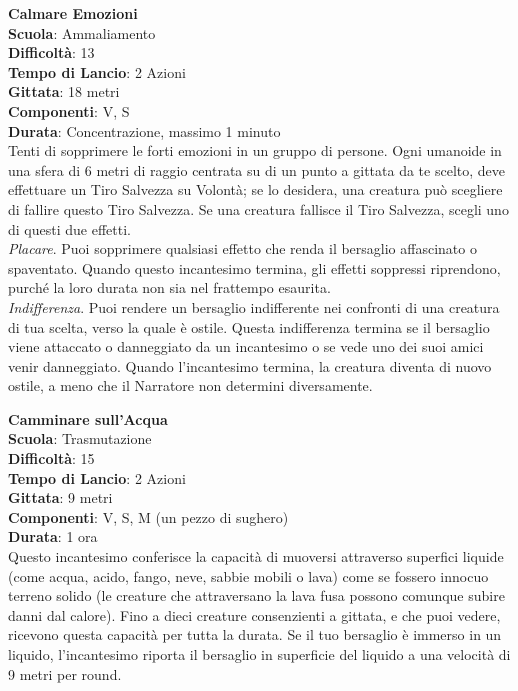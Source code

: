 \begin{multicols}{2}
\medskip\textbf{Calmare Emozioni}\\
\textbf{Scuola}: Ammaliamento\\
\textbf{Difficoltà}: 13\\
\textbf{Tempo di Lancio}: 2 Azioni\\
\textbf{Gittata}: 18 metri\\
\textbf{Componenti}: V, S\\
\textbf{Durata}: Concentrazione, massimo 1 minuto\\
Tenti di sopprimere le forti emozioni in un gruppo di persone. Ogni umanoide in una sfera di 6 metri di raggio centrata su di un punto a gittata da te scelto, deve effettuare un Tiro Salvezza su Volontà; se lo desidera, una creatura può scegliere di fallire questo Tiro Salvezza. Se una creatura fallisce il Tiro Salvezza, scegli uno di questi due effetti. \\
\textit{Placare}. Puoi sopprimere qualsiasi effetto che renda il bersaglio affascinato o spaventato. Quando questo incantesimo termina, gli effetti soppressi riprendono, purché la loro durata non sia nel frattempo esaurita.\\
\textit{Indifferenza}. Puoi rendere un bersaglio indifferente nei confronti di una creatura di tua scelta, verso la quale è ostile. Questa indifferenza termina se il bersaglio viene attaccato o danneggiato da un incantesimo o se vede uno dei suoi amici venir danneggiato. Quando l'incantesimo termina, la creatura diventa di nuovo ostile, a meno che il Narratore non determini diversamente.

\medskip\textbf{Camminare sull'Acqua}\\
\textbf{Scuola}: Trasmutazione\\
\textbf{Difficoltà}: 15\\
\textbf{Tempo di Lancio}: 2 Azioni\\
\textbf{Gittata}: 9 metri\\
\textbf{Componenti}: V, S, M (un pezzo di sughero)\\
\textbf{Durata}: 1 ora\\
Questo incantesimo conferisce la capacità di muoversi attraverso superfici liquide (come acqua, acido, fango, neve, sabbie mobili o lava) come se fossero innocuo terreno solido (le creature che attraversano la lava fusa possono comunque subire danni dal calore). Fino a dieci creature consenzienti a gittata, e che puoi vedere, ricevono questa capacità per tutta la durata. Se il tuo bersaglio è immerso in un liquido, l'incantesimo riporta il bersaglio in superficie del liquido a una velocità di 9 metri per round. 


\end{multicols}
